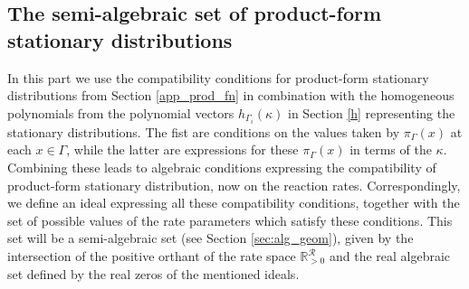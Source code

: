 \documentclass{amsart}
\theoremstyle{definition}
\theoremstyle{remark}
\theoremstyle{Conjecture/open problem}
\theoremstyle{assumption}
\theoremstyle{conjecture}
\def\Ga{\Gamma}
\def\k{\kappa}
\def\cR{\mathcal{R}}
\def\R{\mathbb{R}}
\numberwithin{equation}{section}
\begin{document}
\subsection{The semi-algebraic set of product-form stationary distributions}\label{semi}
In this part we use the compatibility conditions for product-form stationary distributions from Section \ref{app_prod_fn} in combination with the homogeneous polynomials from the polynomial vectors $h_{\Ga_i}(\k)$ in Section \ref{h} representing the stationary distributions. The fist are conditions on the values taken by $\pi _{\Gamma}(x)$ at each $x\in\Gamma$, while the latter are expressions for these $\pi _{\Gamma }(x)$ in terms of the $\k$. Combining these leads to algebraic conditions expressing the compatibility of product-form stationary distribution, now  on the reaction rates. Correspondingly, we define an ideal expressing all these compatibility conditions, together with the set of possible values of the rate parameters which satisfy these conditions. This set will be a semi-algebraic set (see Section \ref{sec:alg_geom}), given by the intersection of the positive orthant of the rate space $\R^\cR_{>0}$ and the real algebraic set defined by the real zeros of the mentioned ideals. 
\end{document}
